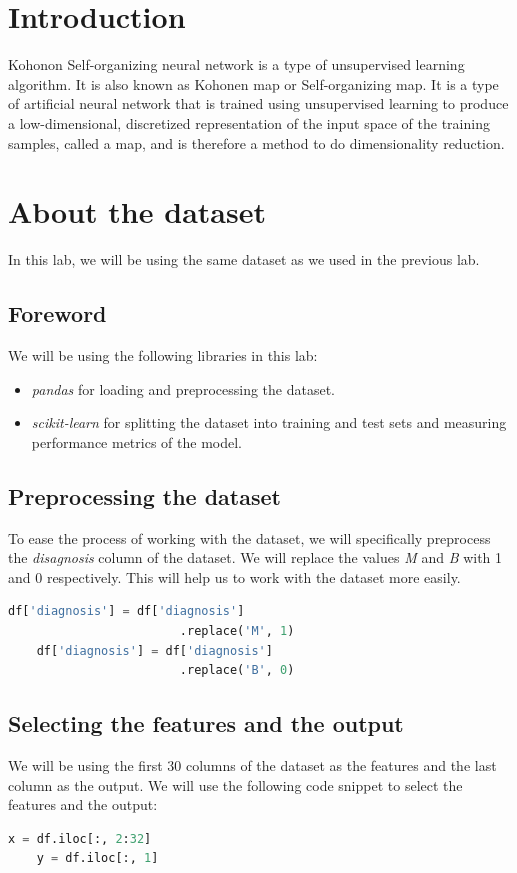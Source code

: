 \section{Introduction}
Kohonon Self-organizing neural network is a type of unsupervised learning algorithm. It is also known as Kohonen map or Self-organizing map. It is a type of artificial neural network that is trained using unsupervised learning to produce a low-dimensional, discretized representation of the input space of the training samples, called a map, and is therefore a method to do dimensionality reduction.\\
\section{About the dataset}
In this lab, we will be using the same dataset as we used in the previous lab.\\
\subsection{Foreword}
We will be using the following libraries in this lab:
\begin{itemize}
    \item \textit{pandas} for loading and preprocessing the dataset.
    \item \textit{scikit-learn} for splitting the dataset into training and test sets and measuring performance metrics of the model.
\end{itemize}
\subsection{Preprocessing the dataset}
To ease the process of working with the dataset, we will specifically preprocess the \textit{disagnosis} column of the dataset. We will replace the values \textit{M} and \textit{B} with 1 and 0 respectively. This will help us to work with the dataset more easily.
\begin{lstlisting}[language=Python]
    df['diagnosis'] = df['diagnosis']
                        .replace('M', 1)
    df['diagnosis'] = df['diagnosis']
                        .replace('B', 0)
\end{lstlisting}
\subsection{Selecting the features and the output}
We will be using the first 30 columns of the dataset as the features and the last column as the output. We will use the following code snippet to select the features and the output:
\begin{lstlisting}[language=Python]
    x = df.iloc[:, 2:32]
    y = df.iloc[:, 1]
\end{lstlisting}
